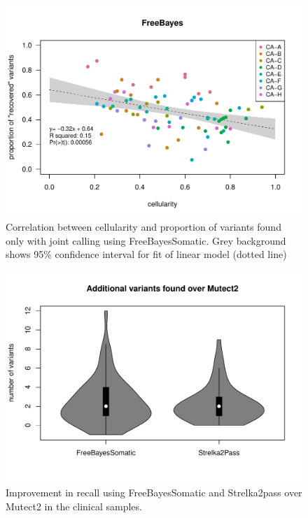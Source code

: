 \begin{figure}[!ht]
\centering
  \includegraphics[width=\textwidth]{Appendices/Variantcalling/supp/S9}
  \caption[Correlation between cellularity and proportion of variants found only with joint calling using FreeBayesSomatic]{Correlation between cellularity and proportion of variants found only with joint calling using FreeBayesSomatic. Grey background shows 95\% confidence interval for fit of linear model (dotted line)}\label{A:fig:S09}
\end{figure}

\begin{figure}[!ht]
\centering
  \includegraphics[width=\textwidth]{Appendices/Variantcalling/supp/S10}
  \caption{Improvement in recall using FreeBayesSomatic and Strelka2pass over Mutect2 in the clinical samples.}\label{A:fig:S10}
\end{figure}

